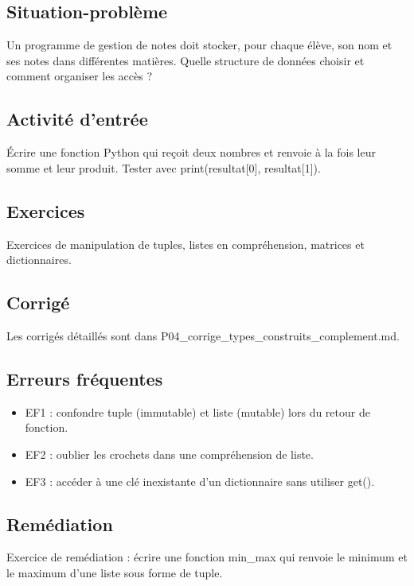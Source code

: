\subsection{Situation-problème}

Un programme de gestion de notes doit stocker, pour chaque élève, son
nom et ses notes dans différentes matières. Quelle structure de données
choisir et comment organiser les accès ?

\subsection{Activité d’entrée}

Écrire une fonction Python qui reçoit deux nombres et renvoie à la fois
leur somme et leur produit. Tester avec print(resultat{[}0{]},
resultat{[}1{]}).

\subsection{Exercices}

Exercices de manipulation de tuples, listes en compréhension, matrices
et dictionnaires.

\subsection{Corrigé}

Les corrigés détaillés sont dans
P04\_corrige\_types\_construits\_complement.md.

\subsection{Erreurs fréquentes}

\begin{itemize}
\tightlist
\item
  EF1 : confondre tuple (immutable) et liste (mutable) lors du retour de
  fonction.
\item
  EF2 : oublier les crochets dans une compréhension de liste.
\item
  EF3 : accéder à une clé inexistante d'un dictionnaire sans utiliser
  get().
\end{itemize}

\subsection{Remédiation}

Exercice de remédiation : écrire une fonction min\_max qui renvoie le
minimum et le maximum d'une liste sous forme de tuple.

